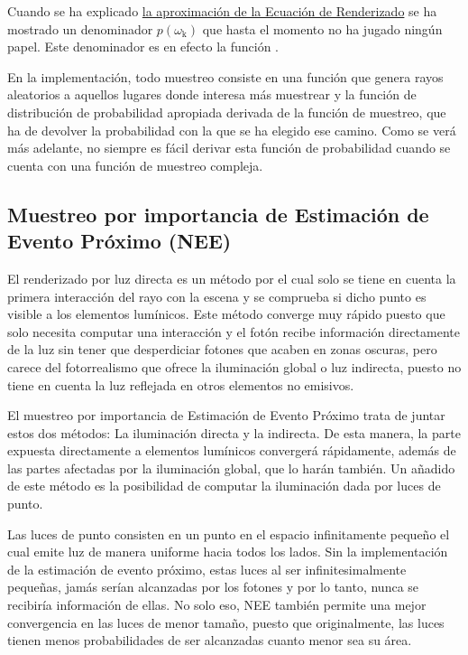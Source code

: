 Cuando se ha explicado \hyperref[subsec:montecarlo]{la aproximación de la Ecuación de Renderizado} se ha mostrado un denominador $p(\omega _{\text{k}})$ que hasta el momento no ha jugado ningún papel. Este denominador es en efecto la función .

En la implementación, todo muestreo consiste en una función que genera rayos aleatorios a aquellos lugares donde interesa más muestrear  y la función de distribución de probabilidad apropiada  derivada de la función de muestreo, que ha de devolver la probabilidad con la que se ha elegido ese camino. Como se verá más adelante, no siempre es fácil derivar esta función de probabilidad cuando se cuenta con una función de muestreo compleja.


\subsection{Muestreo por importancia de Estimación de Evento Próximo (NEE)}
\label{sub:nee}

El renderizado por luz directa es un método por el cual solo se tiene en cuenta la primera interacción del rayo con la escena y se comprueba si dicho punto es visible a los elementos lumínicos. Este método converge muy rápido puesto que solo necesita computar una interacción y el fotón recibe información directamente de la luz sin tener que desperdiciar fotones que acaben en zonas oscuras, pero carece del fotorrealismo que ofrece la iluminación global o luz indirecta, puesto no tiene en cuenta la luz reflejada en otros elementos no emisivos.

El muestreo por importancia de Estimación de Evento Próximo trata de juntar estos dos métodos: La iluminación directa y la indirecta. De esta manera, la parte expuesta directamente a elementos lumínicos convergerá rápidamente, además de las partes afectadas por la iluminación global, que lo harán también. Un añadido de este método es la posibilidad de computar la iluminación dada por luces de punto.

Las luces de punto consisten en un punto en el espacio infinitamente pequeño el cual emite luz de manera uniforme hacia todos los lados. Sin la implementación de la estimación de evento próximo, estas luces al ser infinitesimalmente pequeñas, jamás serían alcanzadas por los fotones y por lo tanto, nunca se recibiría información de ellas. No solo eso, NEE también permite una mejor convergencia en las luces de menor tamaño, puesto que originalmente, las luces tienen menos probabilidades de ser alcanzadas cuanto menor sea su área.

